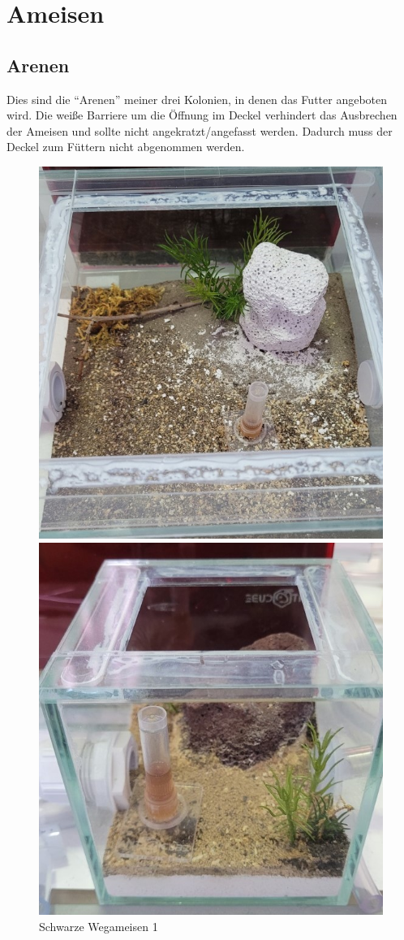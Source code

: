 \chapter{Ameisen}

\section{Arenen}
Dies sind die ``Arenen'' meiner drei Kolonien, in denen das Futter angeboten wird.
Die weiße Barriere um die Öffnung im Deckel verhindert das Ausbrechen der Ameisen und sollte nicht angekratzt/angefasst werden.
Dadurch muss der Deckel zum Füttern nicht abgenommen werden.
\begin{figure}[H]
  \begin{minipage}{.5\textwidth}
    \centering
    \includegraphics[width=.8\linewidth]{resources/L-niger1.jpg}
    \caption[Wegameisen1]{Schwarze Wegameisen 1}
  \end{minipage}%
  \begin{minipage}{.5\textwidth}
    \centering
    \includegraphics[width=.8\linewidth]{resources/L-niger2.jpg}

\end{minipage}
\end{figure}
